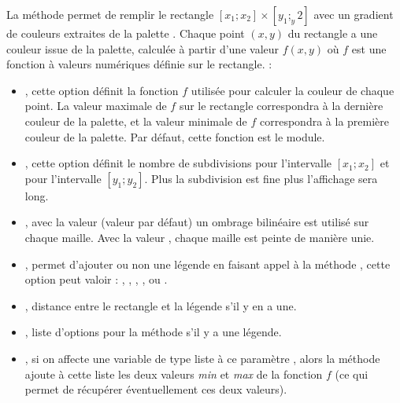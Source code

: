 La méthode  permet de remplir le rectangle $[x_1;x_2]\times [y_1;_y2]$ avec un gradient de couleurs extraites de la palette . Chaque point $(x,y)$ du rectangle a une couleur issue de la palette, calculée à partir d'une valeur $f(x,y)$ où $f$ est une fonction à valeurs numériques définie sur le rectangle. \writeoptions :
\begin{itemize}
    \item {}, cette option définit la fonction $f$ utilisée pour calculer la couleur de chaque point. La valeur maximale de $f$ sur le rectangle correspondra à la dernière couleur de la palette, et la valeur minimale de $f$ correspondra à la première couleur de la palette. Par défaut, cette fonction est le module.
      
    \item {}, cette option définit le nombre de subdivisions pour l'intervalle $[x_1;x_2]$ et pour l'intervalle $[y_1;y_2]$. Plus la subdivision est fine plus l'affichage sera long.
    
    \item {}, avec la valeur \true (valeur par défaut) un ombrage bilinéaire est utilisé sur chaque maille. Avec la valeur \false, chaque maille est peinte de manière unie.
    
    \item {}, permet d'ajouter ou non une légende en faisant appel à la méthode , cette option peut valoir : , , , , ou .
    
    \item {}, distance entre le rectangle et la légende s'il y en a une.
    
    \item {}, liste d'options pour la méthode  s'il y a une légende.
    
    \item {}, si on affecte une variable de type liste à ce paramètre , alors la méthode ajoute à cette liste les deux valeurs \emph{min} et \emph{max} de la fonction $f$ (ce qui permet de récupérer éventuellement ces deux valeurs).
\end{itemize}

